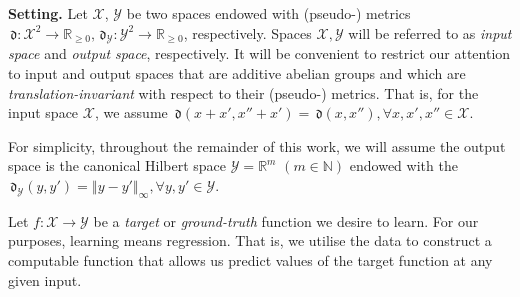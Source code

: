 \documentclass{article} %
\theoremstyle{definition}
\theoremstyle{remark}
\newcommand{\norm}[1]{\left\Vert#1\right\Vert}
\newcommand{\Real}{\mathbb R}
\newcommand{\nat}{\mathbb N}
\newcommand{\inspace}{\ensuremath{ \mathcal X}}
\newcommand{\outspace}{\ensuremath{ \mathcal Y}}
\newcommand{\metric}{\, \mathfrak{d}} %
\newcommand{\predf}{\, \mathfrak{  \hat f}} %
\newcommand{\prederr}{\, \mathfrak{\hat v}} %
\begin{document}
%
%
%
%
%
%
%

%
\textbf{Setting.}  Let $\inspace$, $\outspace$ be two spaces endowed with (pseudo-) metrics $\metric: \inspace^2 \to \Real_{\geq 0}, \metric_\outspace:\outspace^2 \to \Real_{\geq 0}$, respectively. Spaces $\inspace, \outspace$ will be referred to as \textit{input space} and \textit{output space}, respectively. 
It will be convenient to restrict our attention to input and output spaces that are additive abelian groups and which are \emph{translation-invariant} with respect to their (pseudo-) metrics. That is, for the input space $\inspace$, we assume $ \metric(x+x',x''+x') = \metric(x,x''),\forall x,x',x'' \in \inspace$. 

For simplicity, throughout the remainder of this work, we will assume the output space is the canonical Hilbert space $\outspace = \Real^m$ $(m \in \nat)$ endowed with the $\metric_{\outspace}(y,y') = \norm{y-y'}_\infty, \forall y,y' \in \outspace$. 

Let $f: \inspace \to \outspace$ be a \emph{target} or \emph{ground-truth} function we desire to learn. For our purposes, learning means regression. That is, we utilise the data to construct a computable function that allows us predict values of the target function at any given input.

\end{document}
